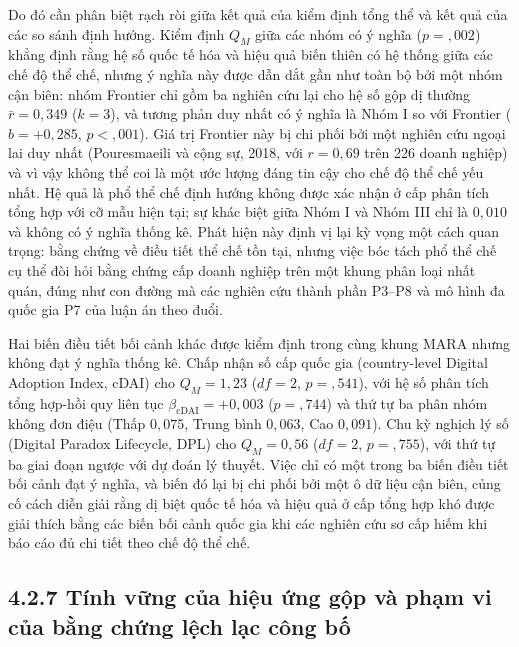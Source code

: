 \documentclass[
  a4paper,
  13pt]{extreport}
\begin{document}
Do đó cần phân biệt rạch ròi giữa kết quả của kiểm định tổng thể và kết
quả của các so sánh định hướng. Kiểm định \(Q_M\) giữa các nhóm có ý
nghĩa (\(p = {,}002\)) khẳng định rằng hệ số quốc tế hóa và hiệu quả
biến thiên có hệ thống giữa các chế độ thể chế, nhưng ý nghĩa này được
dẫn dắt gần như toàn bộ bởi một nhóm cận biên: nhóm Frontier chỉ gồm ba
nghiên cứu lại cho hệ số gộp dị thường \(\bar{r} = 0{,}349\)
(\(k = 3\)), và tương phản duy nhất có ý nghĩa là Nhóm I so với Frontier
(\(b = +0{,}285\), \(p < {,}001\)). Giá trị Frontier này bị chi phối bởi
một nghiên cứu ngoại lai duy nhất (Pouresmaeili và cộng sự, 2018, với
\(r = 0{,}69\) trên 226 doanh nghiệp) và vì vậy không thể coi là một ước
lượng đáng tin cậy cho chế độ thể chế yếu nhất. Hệ quả là phổ thể chế
định hướng không được xác nhận ở cấp phân tích tổng hợp với cỡ mẫu hiện
tại; sự khác biệt giữa Nhóm I và Nhóm III chỉ là \(0{,}010\) và không có
ý nghĩa thống kê. Phát hiện này định vị lại kỳ vọng một cách quan trọng:
bằng chứng về điều tiết thể chế tồn tại, nhưng việc bóc tách phổ thể chế
cụ thể đòi hỏi bằng chứng cấp doanh nghiệp trên một khung phân loại nhất
quán, đúng như con đường mà các nghiên cứu thành phần P3--P8 và mô hình
đa quốc gia P7 của luận án theo đuổi.

Hai biến điều tiết bối cảnh khác được kiểm định trong cùng khung MARA
nhưng không đạt ý nghĩa thống kê. Chấp nhận số cấp quốc gia
(country-level Digital Adoption Index, cDAI) cho \(Q_M = 1{,}23\)
(\(df = 2\), \(p = {,}541\)), với hệ số phân tích tổng hợp-hồi quy liên
tục \(\beta_{\text{cDAI}} = +0{,}003\) (\(p = {,}744\)) và thứ tự ba
phân nhóm không đơn điệu (Thấp \(0{,}075\), Trung bình \(0{,}063\), Cao
\(0{,}091\)). Chu kỳ nghịch lý số (Digital Paradox Lifecycle, DPL) cho
\(Q_M = 0{,}56\) (\(df = 2\), \(p = {,}755\)), với thứ tự ba giai đoạn
ngược với dự đoán lý thuyết. Việc chỉ có một trong ba biến điều tiết bối
cảnh đạt ý nghĩa, và biến đó lại bị chi phối bởi một ô dữ liệu cận biên,
củng cố cách diễn giải rằng dị biệt quốc tế hóa và hiệu quả ở cấp tổng
hợp khó được giải thích bằng các biến bối cảnh quốc gia khi các nghiên
cứu sơ cấp hiếm khi báo cáo đủ chi tiết theo chế độ thể chế.

\hypertarget{tuxednh-vux1eefng-cux1ee7a-hiux1ec7u-ux1ee9ng-gux1ed9p-vuxe0-phux1ea1m-vi-cux1ee7a-bux1eb1ng-chux1ee9ng-lux1ec7ch-lux1ea1c-cuxf4ng-bux1ed1}{%
\subsection{4.2.7 Tính vững của hiệu ứng gộp và phạm vi của bằng chứng
lệch lạc công
bố}\label{tuxednh-vux1eefng-cux1ee7a-hiux1ec7u-ux1ee9ng-gux1ed9p-vuxe0-phux1ea1m-vi-cux1ee7a-bux1eb1ng-chux1ee9ng-lux1ec7ch-lux1ea1c-cuxf4ng-bux1ed1}}
\end{document}
